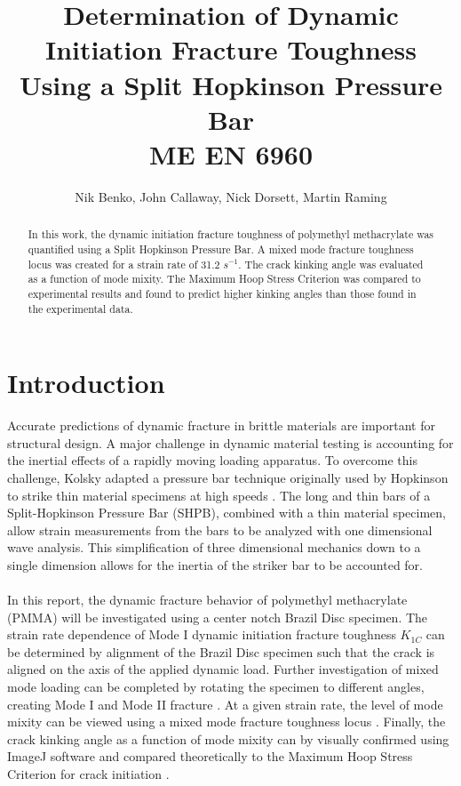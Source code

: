 \documentclass[12pt]{article}
\begin{document}
\title{ Determination of Dynamic Initiation Fracture Toughness Using a Split Hopkinson Pressure Bar  \\ \normalsize{ME EN 6960}}
\author{Nik Benko, John Callaway, Nick Dorsett, Martin Raming}
\maketitle

\begin{abstract} 
In this work, the dynamic initiation fracture toughness of polymethyl methacrylate was quantified using a Split Hopkinson Pressure Bar. A mixed mode fracture toughness locus was created for a strain rate of 31.2 $s^{-1}$. The crack kinking angle was evaluated as a function of mode mixity. The Maximum Hoop Stress Criterion was compared to experimental results and found to predict higher kinking angles than those found in the experimental data.
\end{abstract}

\section{Introduction} %

Accurate predictions of dynamic fracture in brittle materials are important for structural design. A major challenge in dynamic material testing is accounting for the inertial effects of a rapidly moving loading apparatus. To overcome this challenge, Kolsky adapted a pressure bar technique originally used by Hopkinson to strike thin material specimens at high speeds \cite{Kolsky}. The long and thin bars of a Split-Hopkinson Pressure Bar (SHPB), combined with a thin material specimen, allow strain measurements from the bars to be analyzed with one dimensional wave analysis. This simplification of three dimensional mechanics down to a single dimension allows for the inertia of the striker bar to be accounted for.
\\ \\
In this report, the dynamic fracture behavior of polymethyl methacrylate (PMMA) will be investigated using a center notch Brazil Disc specimen. The strain rate dependence of Mode I dynamic initiation fracture toughness $K_{1C}$ can be determined by alignment of the Brazil Disc specimen such that the crack is aligned on the axis of the applied dynamic load. Further investigation of mixed mode loading can be completed by rotating the specimen to different angles, creating Mode I and Mode II fracture \cite{Atkinson} \cite{Shetty}. At a given strain rate, the level of mode mixity can be viewed using a mixed mode fracture toughness locus \cite{Nakano}. Finally, the crack kinking angle as a function of mode mixity can by visually confirmed using ImageJ software and compared theoretically to the Maximum Hoop Stress Criterion for crack initiation \cite{Meggiolaro}.  
 
\end{document}

